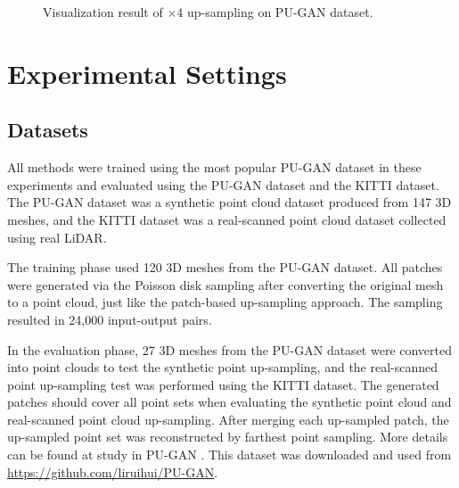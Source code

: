 \documentclass{article}
\begin{document}
\begin{figure*}[htb!]
  \centering
  \caption{Visualization result of $\times 4$ up-sampling on PU-GAN dataset.}
  \label{fig:x4_quality}
\end{figure*}

\section{Experimental Settings}
\label{sec:experiment_settings}

\subsection{Datasets}
\label{sec:dataset}
 \quad All methods were trained using the most popular PU-GAN \cite{li2019pu} dataset in these experiments and evaluated using the PU-GAN dataset and the KITTI \cite{geiger2013vision} dataset. The PU-GAN dataset was a synthetic point cloud dataset produced from 147 3D meshes, and the KITTI dataset was a real-scanned point cloud dataset collected using real LiDAR.
 
\quad The training phase used 120 3D meshes from the PU-GAN dataset. All patches were generated via the Poisson disk sampling after converting the original mesh to a point cloud, just like the patch-based up-sampling approach. The sampling resulted in 24,000 input-output pairs.

 \quad In the evaluation phase, 27 3D meshes from the PU-GAN dataset were converted into point clouds to test the synthetic point up-sampling, and the real-scanned point up-sampling test was performed using the KITTI dataset. The generated patches should cover all point sets when evaluating the synthetic point cloud and real-scanned point cloud up-sampling. After merging each up-sampled patch, the up-sampled point set was reconstructed by farthest point sampling. More details can be found at study in PU-GAN \cite{li2019pu}. This dataset was downloaded and used from \url{https://github.com/liruihui/PU-GAN}.
\end{document}
